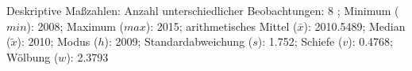 				\label{tableValues:pfec23b}
				\vspace*{-\baselineskip}
                    \begin{noten}
                	    \note{} Deskriptive Maßzahlen:
                	    Anzahl unterschiedlicher Beobachtungen: 8%
                	    ; 
                	      Minimum ($min$): 2008; 
                	      Maximum ($max$): 2015; 
                	      arithmetisches Mittel ($\bar{x}$): \num[round-mode=places,round-precision=2]{2010.5489}; 
                	      Median ($\tilde{x}$): 2010; 
                	      Modus ($h$): 2009; 
                	      Standardabweichung ($s$): \num[round-mode=places,round-precision=2]{1.752}; 
                	      Schiefe ($v$): \num[round-mode=places,round-precision=2]{0.4768}; 
                	      Wölbung ($w$): \num[round-mode=places,round-precision=2]{2.3793}
                     \end{noten}

